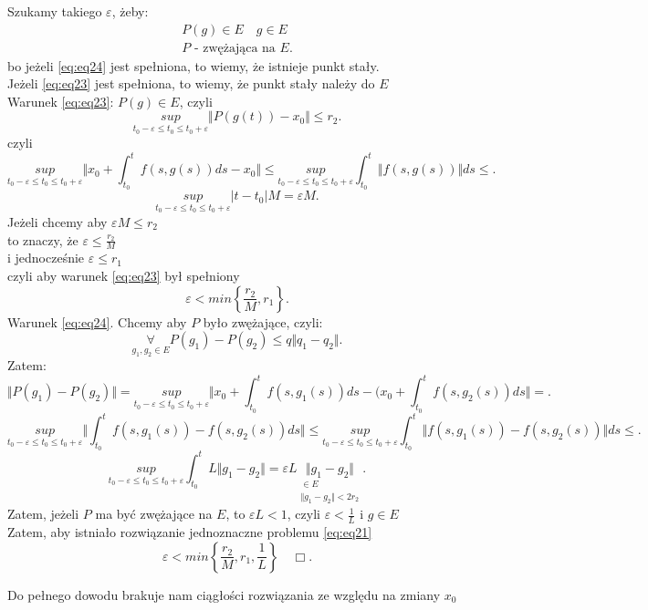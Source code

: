 \documentclass[../main.tex]{subfiles}
\begin{document}
\begin{dowod}
            Szukamy takiego $\varepsilon$, żeby:
            \begin{align}
                P(g)\in E \quad g\in E\label{eq:eq23}\\
                P\text{ - zwężająca na }E\label{eq:eq24}
            .\end{align}
            bo jeżeli \ref{eq:eq24} jest spełniona, to wiemy, że istnieje punkt stały.\\
            Jeżeli \ref{eq:eq23} jest spełniona, to wiemy, że punkt stały należy do  $E$\\
            Warunek \ref{eq:eq23}:
            $P(g)\in E$, czyli
            \[
                \underset{t_0-\varepsilon\leq t_0\leq t_0+\varepsilon}{sup} \Vert P(g(t)) - x_0 \Vert \leq r_2
            .\]
            czyli
            \[
                \underset{t_0-\varepsilon\leq t_0\leq t_0+\varepsilon}{sup} \Vert x_0 + \int_{t_0}^t f(s,g(s))ds - x_0 \Vert \leq \underset{t_0-\varepsilon\leq t_0\leq t_0+\varepsilon}{sup} \int_{t_0}^t \Vert f(s,g(s)) \Vert ds \leq
            .\]
            \[\underset{t_0-\varepsilon\leq t_0\leq t_0+\varepsilon}{sup} |t-t_0| M = \varepsilon M
            .\]
            Jeżeli chcemy aby $\varepsilon M \leq r_2$ \\
            to znaczy, że $\varepsilon \leq \frac{r_2}{M}$ \\
            i jednocześnie $\varepsilon\leq r_1$\\
            czyli aby warunek \ref{eq:eq23} był spełniony
            \[
                \varepsilon < min \left\{ \frac{r_2}{M}, r_1 \right\}
            .\]
            Warunek \ref{eq:eq24}. Chcemy aby $P$ było zwężające, czyli:
            \[
                \underset{g_1,g_2\in E}{\forall}  P(g_1) - P(g_2) \le q\Vert q_1-q_2 \Vert
            .\]
            Zatem:
            \[
                \Vert P(g_1) - P(g_2) \Vert  = \underset{t_0-\varepsilon\leq t_0\leq t_0+\varepsilon}{sup} \Vert x_0 + \int_{t_0}^t f(s,g_1(s))ds - (x_0 + \int_{t_0}^t f(s,g_2(s))ds \Vert =
            .\]
            \[
                \underset{t_0-\varepsilon\leq t_0\leq t_0+\varepsilon}{sup} \Vert \int_{t_0}^t f(s,g_1(s)) - f(s,g_2(s)) ds \Vert \le \underset{t_0-\varepsilon\leq t_0\leq t_0+\varepsilon}{sup} \int_{t_0}^t \Vert f(s,g_1(s)) - f(s,g_2(s)) \Vert ds \le
            .\]
            \[
                \underset{t_0-\varepsilon\leq t_0\leq t_0+\varepsilon}{sup} \int_{t_0}^t L \Vert g_1-g_2 \Vert = \varepsilon L  \underset{\substack{\in E\\ \Vert g_1 - g_2 \Vert < 2r_2}}{\Vert g_1 - g_2 \Vert}
            .\]
            Zatem, jeżeli $P$ ma być zwężające na $E$, to $\varepsilon L < 1$, czyli $\varepsilon< \frac{1}{L}$ i $g\in E$\\
            Zatem, aby istniało rozwiązanie jednoznaczne problemu \ref{eq:eq21} \[
                \varepsilon < min \left\{ \frac{r_2}{M}, r_1, \frac{1}{L} \right\} \quad\Box
            .\]
        \end{dowod}
        Do pełnego dowodu brakuje nam ciągłości rozwiązania ze względu na zmiany $x_0$
\end{document}
